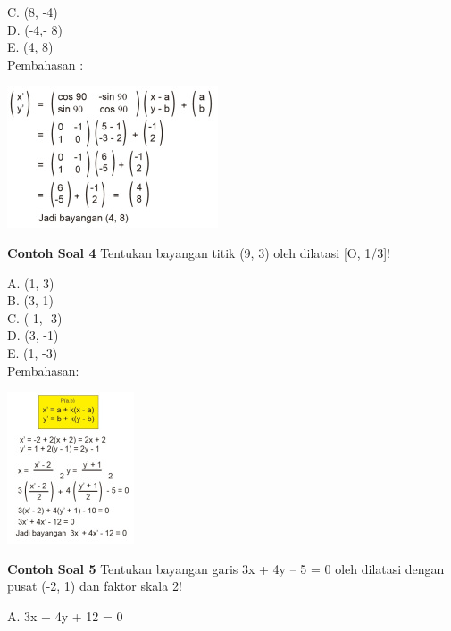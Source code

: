 \documentclass[11pt,fleqn]{book} %
\begin{document}
C. (8, -4)\\

D. (-4,- 8)\\

E. (4, 8)\\

Pembahasan :\\

\noindent
\begin{center}
\includegraphics{Pictures/30.jpg}\\
\end{center}
 \textbf{Contoh Soal 4}
\noindent Tentukan bayangan titik (9, 3) oleh dilatasi [O, 1/3]!

A. (1, 3)\\

B. (3, 1)\\

C. (-1, -3)\\

D. (3, -1)\\

E. (1, -3)\\

Pembahasan:\\

\noindent
\begin{center}
\includegraphics{Pictures/31.jpg}\\
\end{center}

 \textbf{Contoh Soal 5}
\noindent Tentukan bayangan garis 3x + 4y – 5 = 0 oleh dilatasi dengan pusat (-2, 1) dan faktor skala 2!

A. 3x + 4y + 12 = 0 \\
\end{document}
